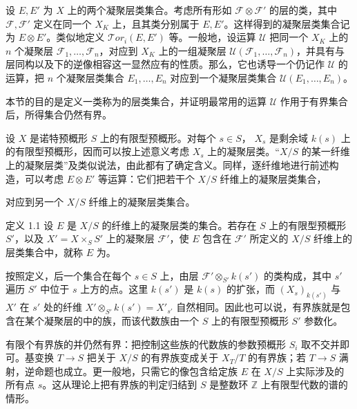 设 $E,E'$ 为 $X$ 上的两个凝聚层类集合。考虑所有形如 $\mathcal F\otimes\mathcal F'$ 的层的类，其中 $\mathcal F,\mathcal F'$ 定义在同一个 $X_K$ 上，且其类分别属于 $E,E'$。这样得到的凝聚层类集合记为 $E\otimes E'$。类似地定义 $\mathcal{T}or_i(E,E')$ 等。一般地，设运算 $\mathcal U$ 把同一个 $X_K$ 上的 $n$ 个凝聚层 $\mathcal F_1,\ldots,\mathcal F_n$，对应到 $X_K$ 上的一组凝聚层 $\mathcal U(\mathcal F_1,\ldots,\mathcal F_n)$，并具有与层同构以及下的逆像相容这一显然应有的性质。那么，它也诱导一个仍记作 $\mathcal U$ 的运算，把 $n$ 个凝聚层类集合 $E_1,\ldots,E_n$ 对应到一个凝聚层类集合 $\mathcal U(E_1,\ldots,E_n)$。

本节的目的是定义一类称为的层类集合，并证明最常用的运算 $\mathcal U$ 作用于有界集合后，所得集合仍然有界。

设 $X$ 是诺特预概形 $S$ 上的有限型预概形。对每个 $s\in S$， $X_s$ 是剩余域 $k(s)$ 上的有限型预概形，因而可以按上述意义考虑 $X_s$ 上的凝聚层类。“$X/S$ 的某一纤维上的凝聚层类”及类似说法，由此都有了确定含义。同样，逐纤维地进行前述构造，可以考虑 $E\otimes E'$ 等运算：它们把若干个 $X/S$ 纤维上的凝聚层类集合，

对应到另一个 $X/S$ 纤维上的凝聚层类集合。

\begin{statement}{定义 1.1}
设 $E$ 是 $X/S$ 的纤维上的凝聚层类的集合。若存在 $S$ 上的有限型预概形 $S'$，以及 $X'=X\times_S S'$ 上的凝聚层 $\mathcal F'$，使 $E$ 包含在 $\mathcal F'$ 所定义的 $X/S$ 纤维上的层类集合中，就称 $E$ 为。
\end{statement}
按照定义，后一个集合在每个 $s\in S$ 上，由层 $\mathcal F'\otimes_{S'}k(s')$ 的类构成，其中 $s'$ 遍历 $S'$ 中位于 $s$ 上方的点。这里 $k(s')$ 是 $k(s)$ 的扩张，而 $(X_s)_{k(s')}$ 与 $X'$ 在 $s'$ 处的纤维 $X'\otimes_{S'}k(s')=X'_{s'}$ 自然相同。因此也可以说，有界族就是包含在某个凝聚层的中的族，而该代数族由一个 $S$ 上的有限型预概形 $S'$ 参数化。

有限个有界族的并仍然有界：把控制这些族的代数族的参数预概形 $S_i$ 取不交并即可。基变换 $T\to S$ 把关于 $X/S$ 的有界族变成关于 $X_T/T$ 的有界族；若 $T\to S$ 满射，逆命题也成立。更一般地，只需它的像包含给定族 $E$ 在 $X/S$ 上实际涉及的所有点 $s$。这从理论上把有界族的判定归结到 $S$ 是整数环 $\mathbb Z$ 上有限型代数的谱的情形。

